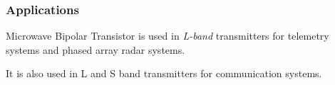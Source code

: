 \begin{frame}
  \frametitle{Applications}
  Microwave Bipolar Transistor is used in \emph{L-band} transmitters for telemetry systems and phased array radar systems.

  It is also used in L and S band transmitters for communication systems.
\end{frame}